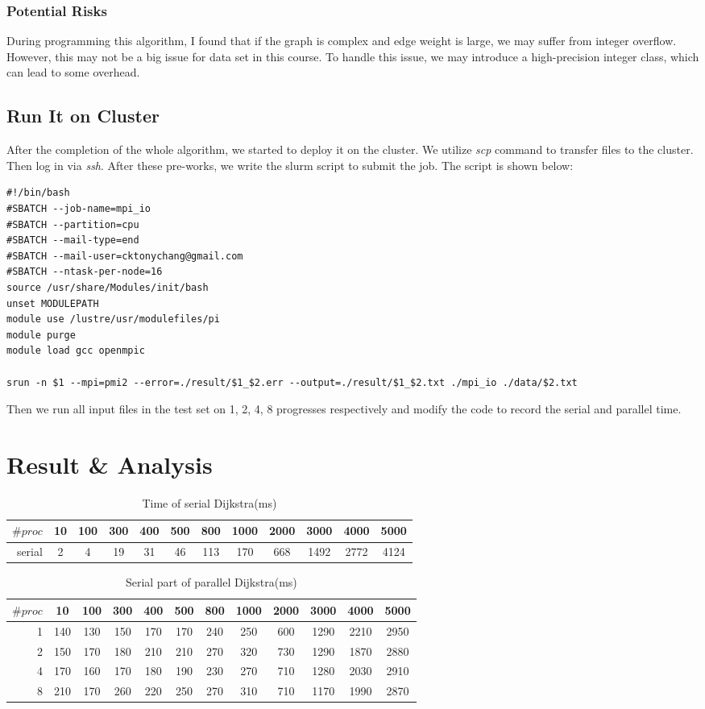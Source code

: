 \documentclass{article}
\begin{document}
\subsubsection{Potential Risks}
During programming this algorithm, I found that if the graph is complex and edge weight is large, we may suffer from integer overflow. However, this may not be a big issue for data set in this course. To handle this issue, we may introduce a high-precision integer class, which can lead to some overhead.



\subsection{Run It on Cluster}
After the completion of the whole algorithm, we started to deploy it on the cluster. We utilize \textit{scp} command to transfer files to the cluster. Then log in via \textit{ssh}. After these pre-works, we write the slurm script to submit the job. The script is shown below:
\begin{lstlisting}
#!/bin/bash
#SBATCH --job-name=mpi_io
#SBATCH --partition=cpu
#SBATCH --mail-type=end
#SBATCH --mail-user=cktonychang@gmail.com
#SBATCH --ntask-per-node=16
source /usr/share/Modules/init/bash
unset MODULEPATH
module use /lustre/usr/modulefiles/pi
module purge
module load gcc openmpic

srun -n $1 --mpi=pmi2 --error=./result/$1_$2.err --output=./result/$1_$2.txt ./mpi_io ./data/$2.txt
\end{lstlisting}
Then we run all input files in the test set on 1, 2, 4, 8 progresses respectively and modify the code to record the serial and parallel time.
\section{Result \& Analysis}
 \begin{table}[H]
 	\begin{tabular}[t]{r|ccccccccccc}
 		$\# proc$&10&100&300&400&500&800&1000&2000&3000&4000&5000\\
 		\hline
 		serial&2&4&19&31&46&113&170&668&1492&2772&4124
 	\end{tabular}\caption{Time of serial Dijkstra(ms)}
 \end{table}
 \begin{table}[H]
 	\begin{tabular}[t]{r|ccccccccccc}
 		$\# proc$&10&100&300&400&500&800&1000&2000&3000&4000&5000\\
 		\hline
 		1&140&130&150&170&170&240&250&600&1290&2210&2950\\
 		2&150&170&180&210&210&270&320&730&1290&1870&2880\\
 		4&170&160&170&180&190&230&270&710&1280&2030&2910\\
 		8&210&170&260&220&250&270&310&710&1170&1990&2870\\
 	\end{tabular}\caption{Serial part of parallel Dijkstra(ms)}
 \end{table}
\end{document}
